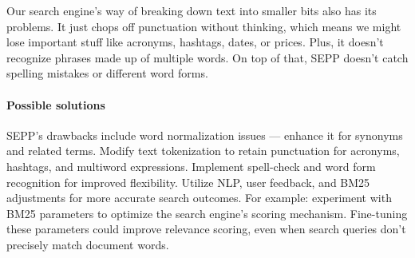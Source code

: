 Our search engine's way of breaking down text into smaller bits also has its problems. It just chops off punctuation without thinking, which means we might lose important stuff like acronyms, hashtags, dates, or prices. Plus, it doesn't recognize phrases made up of multiple words. On top of that, SEPP doesn't catch spelling mistakes or different word forms.

\paragraph{Possible solutions}
SEPP's drawbacks include word normalization issues — enhance it for synonyms and related terms. Modify text tokenization to retain punctuation for acronyms, hashtags, and multiword expressions. Implement spell-check and word form recognition for improved flexibility. Utilize NLP, user feedback, and BM25 adjustments for more accurate search outcomes. For example: experiment with BM25 parameters to optimize the search engine's scoring mechanism. Fine-tuning these parameters could improve relevance scoring, even when search queries don't precisely match document words.

